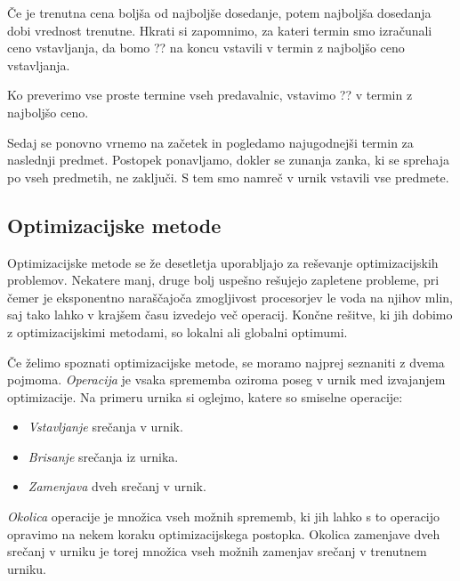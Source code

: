 \documentclass[a4paper, 10pt]{article}
\begin{document}
   Če je trenutna cena boljša od najboljše dosedanje, potem najboljša dosedanja
   dobi vrednost trenutne. Hkrati si zapomnimo, za kateri termin smo izračunali ceno
   vstavljanja, da bomo ?? na koncu vstavili v termin z najboljšo
   ceno vstavljanja.

   Ko preverimo vse proste termine vseh predavalnic, vstavimo ??
   v termin z najboljšo ceno.

   Sedaj se ponovno vrnemo na začetek in pogledamo najugodnejši termin za naslednji
   predmet. Postopek ponavljamo, dokler se zunanja zanka, ki se sprehaja po vseh predmetih,
   ne zaključi. S tem smo namreč v urnik vstavili vse predmete.

\subsection{Optimizacijske metode }%

Optimizacijske metode se že desetletja uporabljajo za reševanje optimizacijskih problemov.
Nekatere manj, druge bolj uspešno rešujejo zapletene probleme, pri čemer je eksponentno
naraščajoča zmogljivost procesorjev le voda na njihov mlin, saj tako lahko v krajšem
času izvedejo več operacij. Končne rešitve, ki jih dobimo z optimizacijskimi metodami,
so lokalni ali globalni optimumi.

Če želimo spoznati optimizacijske metode, se moramo najprej seznaniti z dvema pojmoma.
\emph{Operacija} je vsaka sprememba oziroma poseg v urnik med izvajanjem optimizacije.
Na primeru urnika si oglejmo, katere so smiselne operacije:

   \begin{itemize}
	\item \emph{Vstavljanje} srečanja v urnik.
   \item \emph{Brisanje} srečanja iz urnika.
   \item \emph{Zamenjava} dveh srečanj v urnik.
\end{itemize}
%
\emph{Okolica} operacije je množica vseh možnih sprememb, ki jih lahko s to operacijo
opravimo na nekem koraku optimizacijskega postopka. Okolica zamenjave dveh srečanj v urniku
je torej množica vseh možnih zamenjav srečanj v trenutnem urniku.
\end{document}
